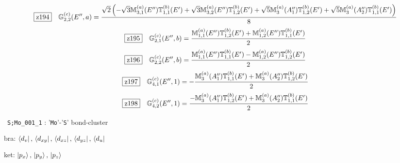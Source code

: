 \documentclass[fleqn,10pt,landscape]{jsarticle}
\begin{document}
\begin{dmath*}
\hspace*{3mm}\fbox{z194}\quad \mathbb{G}_{2,2}^{(c)}(E^{\prime\prime},a)=\frac{\sqrt{2} \left(- \sqrt{3} \mathbb{M}_{3,1}^{(a)}(E^{\prime\prime}) \mathbb{T}_{1,1}^{(b)}(E^{\prime}) + \sqrt{3} \mathbb{M}_{3,2}^{(a)}(E^{\prime\prime}) \mathbb{T}_{1,2}^{(b)}(E^{\prime}) + \sqrt{5} \mathbb{M}_{3}^{(a)}(A_{1}^{\prime\prime}) \mathbb{T}_{1,2}^{(b)}(E^{\prime}) + \sqrt{5} \mathbb{M}_{3}^{(a)}(A_{2}^{\prime\prime}) \mathbb{T}_{1,1}^{(b)}(E^{\prime})\right)}{8}
\end{dmath*}
\begin{dmath*}
\hspace*{3mm}\fbox{z195}\quad \mathbb{G}_{2,1}^{(c)}(E^{\prime\prime},b)=\frac{\mathbb{M}_{1,1}^{(a)}(E^{\prime\prime}) \mathbb{T}_{1,2}^{(b)}(E^{\prime}) + \mathbb{M}_{1,2}^{(a)}(E^{\prime\prime}) \mathbb{T}_{1,1}^{(b)}(E^{\prime})}{2}
\end{dmath*}
\begin{dmath*}
\hspace*{3mm}\fbox{z196}\quad \mathbb{G}_{2,2}^{(c)}(E^{\prime\prime},b)=\frac{\mathbb{M}_{1,1}^{(a)}(E^{\prime\prime}) \mathbb{T}_{1,1}^{(b)}(E^{\prime}) - \mathbb{M}_{1,2}^{(a)}(E^{\prime\prime}) \mathbb{T}_{1,2}^{(b)}(E^{\prime})}{2}
\end{dmath*}
\begin{dmath*}
\hspace*{3mm}\fbox{z197}\quad \mathbb{G}_{4,1}^{(c)}(E^{\prime\prime},1)=- \frac{\mathbb{M}_{3}^{(a)}(A_{1}^{\prime\prime}) \mathbb{T}_{1,1}^{(b)}(E^{\prime}) + \mathbb{M}_{3}^{(a)}(A_{2}^{\prime\prime}) \mathbb{T}_{1,2}^{(b)}(E^{\prime})}{2}
\end{dmath*}
\begin{dmath*}
\hspace*{3mm}\fbox{z198}\quad \mathbb{G}_{4,2}^{(c)}(E^{\prime\prime},1)=\frac{- \mathbb{M}_{3}^{(a)}(A_{1}^{\prime\prime}) \mathbb{T}_{1,2}^{(b)}(E^{\prime}) + \mathbb{M}_{3}^{(a)}(A_{2}^{\prime\prime}) \mathbb{T}_{1,1}^{(b)}(E^{\prime})}{2}
\end{dmath*}
\vspace{5mm}

\noindent\textbullet\, \texttt{S;Mo_001_1} : '\texttt{Mo}'-'\texttt{S}' bond-cluster

\noindent\quad * bra: $\bra{d_{v}},\, \bra{d_{xy}},\, \bra{d_{xz}},\, \bra{d_{yz}},\, \bra{d_{u}}$

\noindent\quad * ket: $\ket{p_{x}},\, \ket{p_{y}},\, \ket{p_{z}}$
\end{document}
